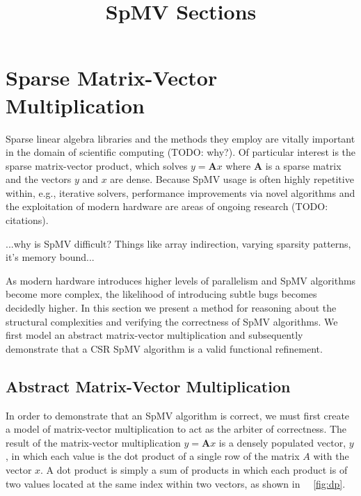 \documentclass[sigconf]{acmart}
\begin{document}
\pagestyle{plain}
\title{SpMV Sections}
\maketitle

\section{Sparse Matrix-Vector Multiplication}

Sparse linear algebra libraries and the methods they employ are vitally important in the domain of scientific computing (TODO: why?).  Of particular interest is the sparse matrix-vector product, which solves $y = \bm{A}x$ where $\bm{A}$ is a sparse matrix and the vectors $y$ and $x$ are dense.  Because SpMV usage is often highly repetitive within, e.g., iterative solvers, performance improvements via novel algorithms and the exploitation of modern hardware are areas of ongoing research (TODO: citations).

...why is SpMV difficult? Things like array indirection, varying sparsity patterns, it's memory bound...

As modern hardware introduces higher levels of parallelism and SpMV algorithms become more complex, the likelihood of introducing subtle bugs becomes decidedly higher.  In this section we present a method for reasoning about the structural complexities and verifying the correctness of SpMV algorithms.  We first model an abstract matrix-vector multiplication and subsequently demonstrate that a CSR SpMV algorithm is a valid functional refinement.

\subsection{Abstract Matrix-Vector Multiplication}
\label{sec:mvmabs}

In order to demonstrate that an SpMV algorithm is correct, we must first create a model of matrix-vector multiplication to act as the arbiter of correctness.  The result of the matrix-vector multiplication $y = \bm{A}x$ is a densely populated vector, $y$, in which each value is the dot product of a single row of the matrix $A$ with the vector $x$.  A dot product is simply a sum of products in which each product is of two values located at the same index within two vectors, as shown in ~\figurename~\ref{fig:dp}.
\end{document}
